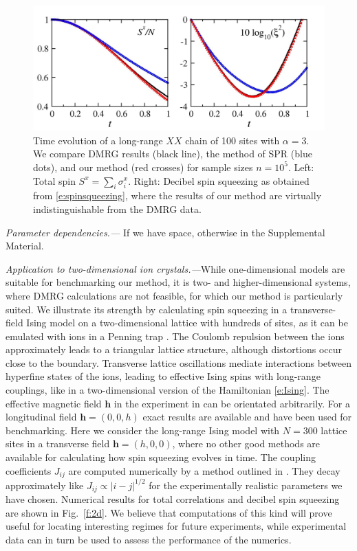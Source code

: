 \documentclass[aps,prl,showpacs,amsmath,amssymb,superscriptaddress,reprint,10pt]{revtex4-1}
\newcommand{\mk}[1]{{\color{michael} #1}}
\newcommand{\mvec}[1]{\boldsymbol #1}
\begin{document}
\begin{figure}\centering
\includegraphics[width=\linewidth]{./Jx05Jy05_Schach_N100_alph3_nt100000.jpg}
\caption{\label{f:XX}%
Time evolution of a long-range $XX$ chain of 100 sites with $\alpha=3$. We compare DMRG results (black line), the method of SPR (blue dots), and our method (red crosses) for sample sizes $n=10^5$. Left: Total spin $S^x=\sum_i\sigma_i^x$. Right: Decibel spin squeezing as obtained from \eqref{e:spinsqueezing}, where the results of our method are virtually indistinguishable from the DMRG data.
}%
\end{figure}


{\em Parameter dependencies.---}\mk{If we have space, otherwise in the Supplemental Material.}


{\em Application to two-dimensional ion crystals.---}While one-dimensional models are suitable for benchmarking our method, it is two- and higher-dimensional systems, where DMRG calculations are not feasible, for which our method is particularly suited. We illustrate its strength by calculating spin squeezing in a transverse-field Ising model on a two-dimensional lattice with hundreds of sites, as it can be emulated with ions in a Penning trap \cite{Britton_etal12}. The Coulomb repulsion between the ions approximately leads to a triangular lattice structure, although distortions occur close to the boundary. Transverse lattice oscillations mediate interactions between hyperfine states of the ions, leading to effective Ising spins with long-range couplings, like in a two-dimensional version of the Hamiltonian \eqref{e:Ising}. The effective magnetic field $\mvec{h}$ in the experiment in \cite{Britton_etal12} can be orientated arbitrarily. For a longitudinal field $\mvec{h}=(0,0,h)$ exact results are available 
and have been used for benchmarking. Here we consider the long-range Ising model with $N=300$ lattice sites in a transverse field $\mvec{h}=(h,0,0)$, where no other good methods are available for calculating how spin squeezing evolves in time. The coupling coefficients $J_{ij}$ are computed numerically by a method outlined in \cite{Britton_etal12}. They decay approximately like $J_{ij}\propto|i-j|^{1/2}$ for the experimentally realistic parameters we have chosen. Numerical results for total correlations and decibel spin squeezing are shown in Fig.~\ref{f:2d}. We believe that computations of this kind will prove useful for locating interesting regimes for future experiments, while experimental data can in turn be used to assess the performance of the numerics.
\end{document}
